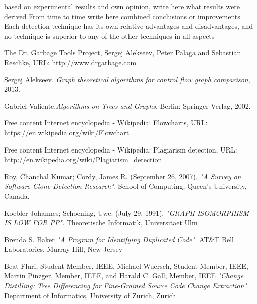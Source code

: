 \documentclass{report}
\begin{document}
based on experimental results and own opinion, write here what results were derived 
From time to time write here combined conclusions or improvements
Each detection
technique has its own relative advantages and disadvantages, and no technique is superior to any of the other
techniques in all aspects



\newpage
%
\begin{thebibliography}{100} %

 The Dr. Garbage Tools Project\textregistered {}, Sergej Alekseev, Peter Palaga and Sebastian Reschke, URL:
\url{http://www.drgarbage.com}

  Sergej Alekseev. \emph{ Graph theoretical algorithms for control flow graph comparison}, 2013.
 
 Gabriel Valiente,\emph{Algorithms on Trees and Graphs}, Berlin: Springer-Verlag, 2002.

 Free content Internet encyclopedia - Wikipedia: Flowcharts, URL: \url{https://en.wikipedia.org/wiki/Flowchart}

 Free content Internet encyclopedia - Wikipedia: Plagiarism detection, URL: \url{http://en.wikipedia.org/wiki/Plagiarism_detection}
 
 Roy, Chanchal Kumar; Cordy, James R. (September 26, 2007). \emph{"A Survey on Software Clone Detection Research".} School of Computing, Queen's University, Canada.

 Koebler Johannes; Schoening, Uwe. (July 29, 1991). \emph{"GRAPH ISOMORPHISM IS LOW FOR PP".} Theoretische Informatik, Universitaet Ulm

 Brenda S. Baker \emph{"A Program for Identifying Duplicated Code".} AT\&T Bell Laboratories, Murray Hill, New Jersey

 Beat Fluri, Student Member, IEEE, Michael Wuersch, Student Member, IEEE, Martin Pinzger, Member, IEEE, and Harald C. Gall, Member, IEEE \emph{"Change Distilling: Tree Differencing for Fine-Grained Source Code Change Extraction".} Department of Informatics, University of Zurich, Zurich 


\end{thebibliography}
\end{document}
